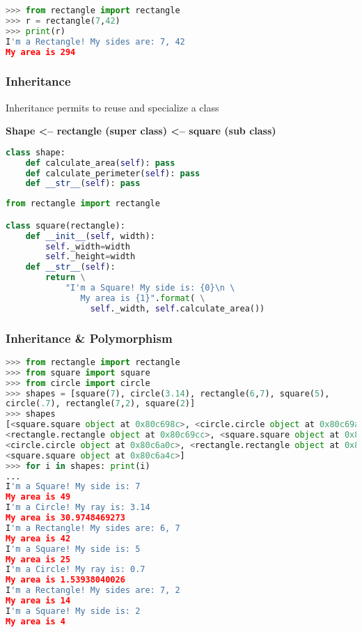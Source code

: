 \begin{lstlisting}[language=Python]
>>> from rectangle import rectangle
>>> r = rectangle(7,42)
>>> print(r)
I'm a Rectangle! My sides are: 7, 42
My area is 294
\end{lstlisting}

\subsubsection{Inheritance}

Inheritance permits to reuse and specialize a class

\textbf{Shape <-- rectangle (super class) <-- square (sub class)}

\begin{lstlisting}[language=Python]
class shape:
	def calculate_area(self): pass
	def calculate_perimeter(self): pass
	def __str__(self): pass
\end{lstlisting}

\begin{lstlisting}[language=Python]
from rectangle import rectangle

class square(rectangle):
	def __init__(self, width):
		self._width=width
		self._height=width
	def __str__(self):
		return \
			"I'm a Square! My side is: {0}\n \
			   My area is {1}".format( \
	             self._width, self.calculate_area())
\end{lstlisting}

\subsubsection{Inheritance \& Polymorphism}

\begin{lstlisting}[language=Python]
>>> from rectangle import rectangle
>>> from square import square
>>> from circle import circle
>>> shapes = [square(7), circle(3.14), rectangle(6,7), square(5),
circle(.7), rectangle(7,2), square(2)]
>>> shapes
[<square.square object at 0x80c698c>, <circle.circle object at 0x80c69ac>,
<rectangle.rectangle object at 0x80c69cc>, <square.square object at 0x80c69ec>,
<circle.circle object at 0x80c6a0c>, <rectangle.rectangle object at 0x80c6a2c>,
<square.square object at 0x80c6a4c>]
>>> for i in shapes: print(i)
...
I'm a Square! My side is: 7
My area is 49
I'm a Circle! My ray is: 3.14
My area is 30.9748469273
I'm a Rectangle! My sides are: 6, 7
My area is 42
I'm a Square! My side is: 5
My area is 25
I'm a Circle! My ray is: 0.7
My area is 1.53938040026
I'm a Rectangle! My sides are: 7, 2
My area is 14
I'm a Square! My side is: 2
My area is 4
\end{lstlisting}

